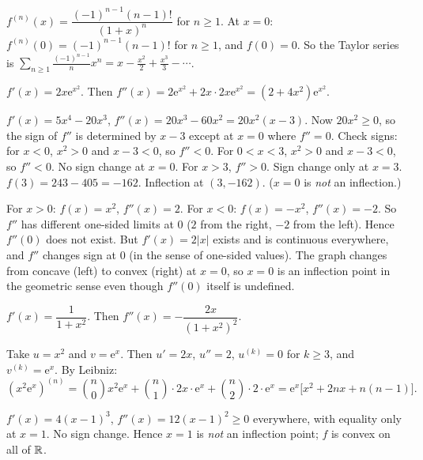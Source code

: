 \begin{solutions}
  \item $f^{(n)}(x)=\dfrac{(-1)^{n-1}(n-1)!}{(1+x)^{n}}$ for $n\geq 1$. At
        $x=0$: $f^{(n)}(0)=(-1)^{n-1}(n-1)!$ for $n\geq 1$, and $f(0)=0$.
        So the Taylor series is
        $\displaystyle\sum_{n\geq 1}\frac{(-1)^{n-1}}{n}x^{n}
        =x-\frac{x^{2}}{2}+\frac{x^{3}}{3}-\cdots$.

  \item $f'(x)=2x\mathrm{e}^{x^{2}}$. Then
        $f''(x)=2\mathrm{e}^{x^{2}}+2x\cdot 2x\mathrm{e}^{x^{2}}
               =(2+4x^{2})\mathrm{e}^{x^{2}}$.

  \item $f'(x)=5x^{4}-20x^{3}$, $f''(x)=20x^{3}-60x^{2}=20x^{2}(x-3)$.
        Now $20x^{2}\geq 0$, so the sign of $f''$ is determined by $x-3$
        except at $x=0$ where $f''=0$. Check signs: for $x<0$, $x^{2}>0$
        and $x-3<0$, so $f''<0$. For $0<x<3$, $x^{2}>0$ and $x-3<0$, so
        $f''<0$. No sign change at $x=0$. For $x>3$, $f''>0$. Sign change
        only at $x=3$. $f(3)=243-405=-162$. Inflection at $(3,-162)$.
        ($x=0$ is \emph{not} an inflection.)

  \item For $x>0$: $f(x)=x^{2}$, $f''(x)=2$. For $x<0$: $f(x)=-x^{2}$,
        $f''(x)=-2$. So $f''$ has different one-sided limits at $0$ ($2$
        from the right, $-2$ from the left). Hence $f''(0)$ does not
        exist. But $f'(x)=2|x|$ exists and is continuous everywhere, and
        $f''$ changes sign at $0$ (in the sense of one-sided values). The
        graph changes from concave (left) to convex (right) at $x=0$, so
        $x=0$ is an inflection point in the geometric sense even though
        $f''(0)$ itself is undefined.

  \item $f'(x)=\dfrac{1}{1+x^{2}}$. Then
        $f''(x)=-\dfrac{2x}{(1+x^{2})^{2}}$.

  \item Take $u=x^{2}$ and $v=\mathrm{e}^{x}$. Then $u'=2x$, $u''=2$,
        $u^{(k)}=0$ for $k\geq 3$, and $v^{(k)}=\mathrm{e}^{x}$. By
        Leibniz:
        \[
          (x^{2}\mathrm{e}^{x})^{(n)}
            =\binom{n}{0}x^{2}\mathrm{e}^{x}
             +\binom{n}{1}\cdot 2x\cdot\mathrm{e}^{x}
             +\binom{n}{2}\cdot 2\cdot\mathrm{e}^{x}
            =\mathrm{e}^{x}\bigl[x^{2}+2nx+n(n-1)\bigr] .
        \]

  \item $f'(x)=4(x-1)^{3}$, $f''(x)=12(x-1)^{2}\geq 0$ everywhere, with
        equality only at $x=1$. No sign change. Hence $x=1$ is \emph{not}
        an inflection point; $f$ is convex on all of $\mathbb{R}$.


\end{solutions}
